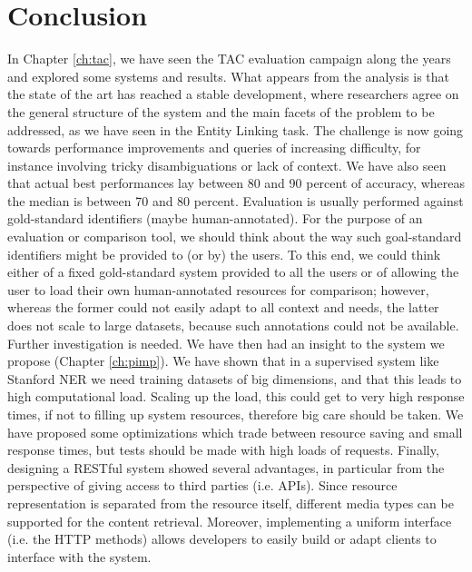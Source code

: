 \documentclass[a4paper,11pt]{report}
\begin{document}
\chapter{Conclusion}
In Chapter \ref{ch:tac}, we have seen the TAC evaluation campaign along the years and explored some systems and results. What appears from the analysis is that the state of the art has reached a stable development, where researchers agree on the general structure of the system and the main facets of the problem to be addressed, as we have seen in the Entity Linking task. The challenge is now going towards performance improvements and queries of increasing difficulty, for instance involving tricky disambiguations or lack of context.
We have also seen that actual best performances lay between 80 and 90 percent of accuracy, whereas the median is between 70 and 80 percent. %
Evaluation is usually performed against gold-standard identifiers (maybe human-annotated).  For the purpose of an evaluation or comparison tool, we should think about the way such goal-standard identifiers might be provided to (or by) the users. To this end, we could think either of a fixed gold-standard system provided to all the users or of allowing the user to load their own human-annotated resources for comparison; however, whereas the former could not easily adapt to all context and needs, the latter does not scale to large datasets, because such annotations could not be available. Further investigation is needed.
We have then had an insight to the system we propose (Chapter \ref{ch:pimp}). We have shown that in a supervised system like Stanford NER we need training datasets of big dimensions, and that this leads to high computational load. Scaling up the load, this could get to very high response times, if not to filling up system resources, therefore big care should be taken. We have proposed some optimizations which trade between resource saving and small response times, but tests should be made with high loads of requests.
Finally, designing a RESTful system showed several advantages, in particular from the perspective of giving access to third parties (i.e. APIs). Since resource representation is separated from the resource itself, different media types can be supported for the content retrieval. Moreover, implementing a uniform interface (i.e. the HTTP methods) allows developers to easily build or adapt clients to interface with the system.
\cleardoublepage
{}

\nocite{*}
\end{document}
